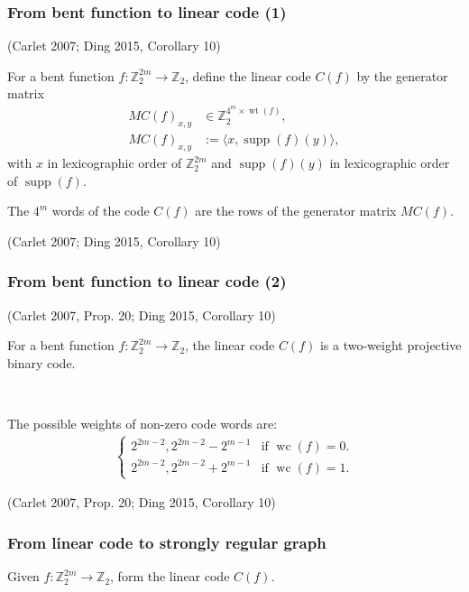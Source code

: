 \documentclass[pdf,sprung,slideColor,nocolorBG]{beamer}
\newenvironment{colortheme}[1]{
\def\ProvidesPackageRCS $##1${\relax}
\renewcommand{\ProcessOptions}{\relax}
\makeatletter

\makeatother
}{}
\newcommand{\slidecite}[1]{\tiny{(#1)}\normalsize{}}
\newcommand{\smallcite}[1]{\small{(#1)}\normalsize{}}
\newcommand{\mb}[1]{\mathbb{#1}}
\newcommand{\To}{\rightarrow}
\newcommand{\support}[1]{\operatorname{supp}\left(#1\right)}
\newcommand{\weight}[1]{\operatorname{wt}\left(#1\right)}
\newcommand{\weightclass}[1]{\operatorname{wc}\left(#1\right)}
\newcommand{\Z}{\mb{Z}}
\begin{document}
\begin{colortheme}{seagull}
\begin{frame}
\frametitle{From bent function to linear code (1)}
\begin{Definition}

\smallcite{Carlet 2007; Ding 2015, Corollary 10} 

For a bent function $f : \Z_2^{2m} \To \Z_2$, 
define the linear code $C(f)$ by the generator matrix
\begin{align*}
M C(f)_{x,y} &\in \Z_2^{4^m \times \weight{f}},
\\
M C(f)_{x,y} &:= \langle x, \support{f}(y) \rangle,
\end{align*}
with $x$ in lexicographic order of $\Z_2^{2m}$ 
and $\support{f}(y)$ in lexicographic order of $\support{f}$.

The $4^m$ words of the code $C(f)$ are the rows of the generator matrix $M C(f)$.
\end{Definition}

\slidecite{Carlet 2007; Ding 2015, Corollary 10} 
 
\end{frame}
\begin{frame}
\frametitle{From bent function to linear code (2)}
\begin{Theorem}
\smallcite{Carlet 2007, Prop. 20; Ding 2015, Corollary 10} 

For a bent function $f : \Z_2^{2m} \To \Z_2$, the linear code $C(f)$
is a two-weight projective binary code.

~

The possible weights of non-zero code words are:
\begin{align*}
\begin{cases}
2^{2m-2}, 2^{2m-2} - 2^{m-1} & \text{if~} \weightclass{f}=0.
\\
2^{2m-2}, 2^{2m-2} + 2^{m-1} & \text{if~} \weightclass{f}=1.
\end{cases}
\end{align*}

\end{Theorem}

\slidecite{Carlet 2007, Prop. 20; Ding 2015, Corollary 10} 
 
\end{frame}
\begin{frame}
\frametitle{From linear code to strongly regular graph}
\begin{Definition}

Given $f : \Z_2^{2m} \To \Z_2$, form the linear code $C(f)$.


\end{Definition}
\end{frame}
\end{colortheme}
\end{document}
